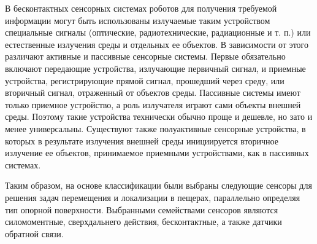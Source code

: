 В бесконтактных сенсорных системах роботов для получения требуемой информации могут быть использованы излучаемые таким устройством специальные сигналы (оптические, радиотехнические, радиационные и т. п.) или естественные излучения среды и отдельных ее объектов. В зависимости от этого различают активные и пассивные сенсорные системы. Первые обязательно включают передающие устройства, излучающие первичный сигнал, и приемные устройства, регистрирующие прямой сигнал, прошедший через среду, или вторичный сигнал, отраженный от объектов среды. Пассивные системы имеют только приемное устройство, а роль излучателя играют сами объекты внешней среды. Поэтому такие устройства технически обычно проще и дешевле, но зато и менее универсальны. Существуют также полуактивные сенсорные устройства, в которых в результате излучения внешней среды инициируется вторичное излучение ее объектов, принимаемое приемными устройствами, как в пассивных системах.
 
Таким образом, на основе классификации были выбраны следующие сенсоры для решения задач перемещения и локализации в пещерах, параллельно определяя тип опорной поверхности. Выбранными семействами сенсоров являются силомоментные, сверхдальнего действия, бесконтактные, а также датчики обратной связи.


